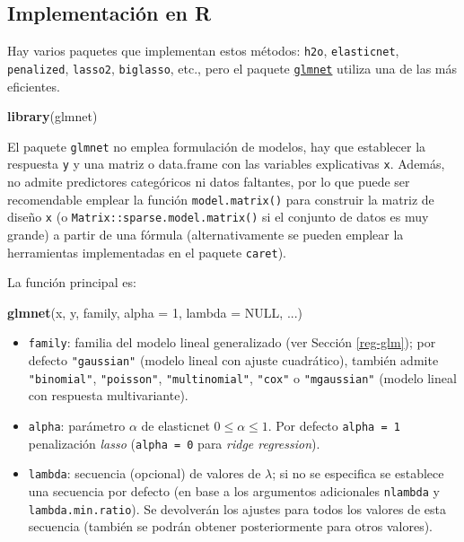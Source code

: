 \documentclass[
]{book}
\newenvironment{Shaded}{\begin{snugshade}}{\end{snugshade}}
\newcommand{\DataTypeTok}[1]{\textcolor[rgb]{0.13,0.29,0.53}{#1}}
\newcommand{\DecValTok}[1]{\textcolor[rgb]{0.00,0.00,0.81}{#1}}
\newcommand{\KeywordTok}[1]{\textcolor[rgb]{0.13,0.29,0.53}{\textbf{#1}}}
\newcommand{\NormalTok}[1]{#1}
\newcommand{\OtherTok}[1]{\textcolor[rgb]{0.56,0.35,0.01}{#1}}
\theoremstyle{break}
\theoremstyle{definition}
\theoremstyle{definition}
\theoremstyle{definition}
\theoremstyle{remark}
\begin{document}
\hypertarget{implementaciuxf3n-en-r}{%
\subsection{Implementación en R}\label{implementaciuxf3n-en-r}}

Hay varios paquetes que implementan estos métodos: \texttt{h2o}, \texttt{elasticnet}, \texttt{penalized}, \texttt{lasso2}, \texttt{biglasso}, etc., pero el paquete \href{https://glmnet.stanford.edu}{\texttt{glmnet}} utiliza una de las más eficientes.

\begin{Shaded}
\begin{Highlighting}[]
\KeywordTok{library}\NormalTok{(glmnet)}
\end{Highlighting}
\end{Shaded}

El paquete \texttt{glmnet} no emplea formulación de modelos, hay que establecer la respuesta
\texttt{y} y una matriz o data.frame con las variables explicativas \texttt{x}.
Además, no admite predictores categóricos ni datos faltantes, por lo que puede ser recomendable emplear la función \texttt{model.matrix()} para construir la matriz de diseño \texttt{x} (o \texttt{Matrix::sparse.model.matrix()} si el conjunto de datos es muy grande) a partir de una fórmula (alternativamente se pueden emplear la herramientas implementadas en el paquete \texttt{caret}).

La función principal es:

\begin{Shaded}
\begin{Highlighting}[]
\KeywordTok{glmnet}\NormalTok{(x, y, family, }\DataTypeTok{alpha =} \DecValTok{1}\NormalTok{, }\DataTypeTok{lambda =} \OtherTok{NULL}\NormalTok{, ...)}
\end{Highlighting}
\end{Shaded}

\begin{itemize}
\item
  \texttt{family}: familia del modelo lineal generalizado (ver Sección \ref{reg-glm}); por defecto \texttt{"gaussian"} (modelo lineal con ajuste cuadrático), también admite \texttt{"binomial"}, \texttt{"poisson"}, \texttt{"multinomial"}, \texttt{"cox"} o \texttt{"mgaussian"} (modelo lineal con respuesta multivariante).
\item
  \texttt{alpha}: parámetro \(\alpha\) de elasticnet \(0 \leq \alpha \leq 1\). Por defecto \texttt{alpha\ =\ 1} penalización \emph{lasso} (\texttt{alpha\ =\ 0} para \emph{ridge regression}).
\item
  \texttt{lambda}: secuencia (opcional) de valores de \(\lambda\); si no se especifica se establece una secuencia por defecto (en base a los argumentos adicionales \texttt{nlambda} y \texttt{lambda.min.ratio}). Se devolverán los ajustes para todos los valores de esta secuencia (también se podrán obtener posteriormente para otros valores).
\end{itemize}
\end{document}
